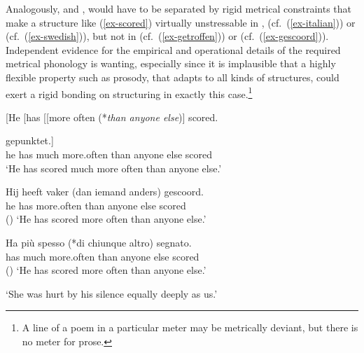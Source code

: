 \documentclass[output=paper
  ,nobabel
  ,uniformtopskip %
]{langscibook}
\begin{document}
\label{ex-muchsmaller}

\label{ex-building}
\zl

\largerpage[2]
\noindent
Analogously,  and , would have to be separated by rigid metrical constraints that make a structure like (\ref{ex-scored}) virtually unstressable in ,  (cf.\ (\ref{ex-italian})) or  (cf.\ (\ref{ex-swedish})), but not in  (cf.\ (\ref{ex-getroffen})) or  (cf.\ (\ref{ex-gescoord})). Independent evidence for the empirical and operational details of the required metrical phonology is wanting, especially since it is implausible that a highly flexible property such as prosody, that adapts to all kinds of structures, could exert a rigid bonding on structuring in exactly this case.\footnote{A line of a poem in a particular meter may be metrically deviant, but there is no meter for prose.}

\eal
\ex\label{ex-scored}
[He [has [[more often (*\emph{than anyone else})] scored.

\ex\label{ex-getroffen}
\gll [Er [hat [[viel öfter (als jeder andere)] gepunktet.] \\
\spacebr{}he \spacebr{}has \hphantom{[[}much more.often \spacebr{}than anyone else scored \\%
\glt `He has scored much more often than anyone else.'

\ex\label{ex-gescoord}
\gll Hij heeft vaker      (dan iemand anders) gescoord. \\
     he  has   more.often \spacebr{}than anyone else scored \\\hfill()
\glt `He has scored more often than anyone else.'

\ex\label{ex-italian}
\gll Ha  più  spesso (*di              chiunque altro)  segnato. \\
     has much more.often  \hphantom{(*}than anyone   else scored \\\hfill()
\glt `He has scored more often than anyone else.'

\ex\label{ex-swedish}
\glt `She was hurt by his silence equally deeply as us.'
\zl
\end{document}
